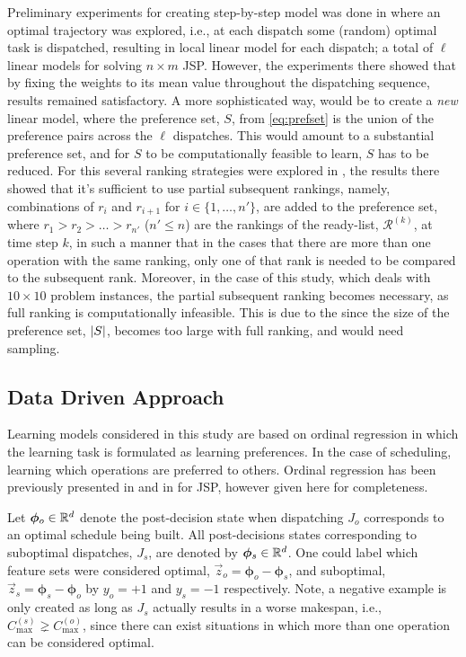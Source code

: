 \documentclass[smallextended]{svjour3}
\renewcommand{\vphi}{\bm \phi}
\begin{document}
	Preliminary experiments for creating step-by-step model was done in \cite{InRu11a} where an optimal trajectory was explored, i.e., at each dispatch some (random) optimal task is dispatched, resulting in local linear model for each dispatch; a total of $\ell$ linear models for solving $n\times m$ JSP. However, the experiments there showed that by fixing the weights to its mean value throughout the dispatching sequence, results remained satisfactory.  
	A more sophisticated way, would be to create a \emph{new} linear model, where the preference set, $S$, from \cref{eq:prefset} is the union of the preference pairs across the $\ell$ dispatches. 
	This would amount to a substantial preference set, and for $S$ to be computationally feasible to learn, $S$ has to be reduced. For this several ranking strategies were explored in \cite{InRu14b}, the results there showed that it's sufficient to use partial subsequent rankings, namely, combinations of $r_i$ and $r_{i+1}$ for $i\in\{1,\ldots,n'\}$, are added to the preference set, where $r_1>r_2>\ldots>r_{n'}$ ($n'\leq n$) are the rankings of the ready-list, $\mathcal{R}^{(k)}$, at time step $k$, in such a manner that in the cases that there are more than one operation with the same ranking, only one of that rank is needed to be compared to the subsequent rank. Moreover, in the case of this study, which deals with $10\times 10$ problem instances, the partial subsequent ranking becomes necessary, as full ranking is computationally infeasible. This is due to the since the size of the preference set, $\lvert S\rvert$, becomes too large with full ranking, and would need sampling. 
	
	\subsection{Data Driven Approach}\label{sec:datadriven}	
	Learning models considered in this study are based on ordinal regression in which the learning task is formulated as learning preferences. In the case of scheduling, learning which operations are preferred to others. Ordinal regression has been previously presented in \cite{Ru06:PPSN} and in \cite{InRu11a} for JSP, however given here for completeness. 
	
	Let $\vphi_{o}\in\R^d$ denote the post-decision state when dispatching $J_o$ corresponds to an optimal schedule being built. All post-decisions states corresponding to suboptimal dispatches, $J_s$, are denoted by $\vphi_{s}\in\R^d$. One could label which feature sets were considered optimal, $\vec{z}_{o}=\vphi_{o}-\vphi_{s}$, and suboptimal, $\vec{z}_{s}=\vphi_{s}-\vphi_{o}$ by $y_o=+1$ and $y_s=-1$ respectively. 
	Note, a negative example is only created as long as $J_s$ actually results in a worse makespan, i.e., $C_{\max}^{(s)}\gneq C_{\max}^{(o)}$, since there can exist situations in which more than one operation can be considered optimal. 
	
\end{document}
